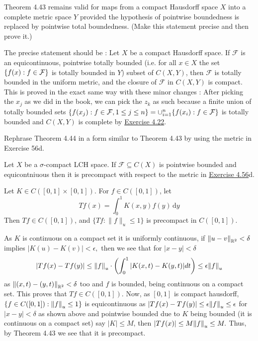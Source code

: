 \documentclass[12pt,a4paper]{article}
\begin{document}
\begin{problem}\label{prob:4-61}
Theorem 4.43 remains valid for maps from a compact Hausdorff space $X$ into a complete metric space $Y$ provided the hypothesis of pointwise boundedness is replaced by pointwise total boundedness. (Make this statement precise and then prove it.)
\end{problem}
\begin{solution}
The precise statement should be : Let $X$ be a compact Hausdorff space. 
If $\mathcal F$ is an equicontinuous, pointwise totally bounded (i.e. for all $x\in X$ the set $ \qty{f(x):f\in\mathcal F}$ is totally bounded in $Y$) subset of $C(X,Y)$, then $\mathcal F$ is totally bounded in the uniform metric, and the closure of $\mathcal F$ in $C(X,Y)$ is compact. \\
This is proved in the exact same way with these minor changes : After picking the $x_j$ as we did in the book, we can pick the $z_k$ as such because a finite union of totally bounded sets $ \qty{f(x_j):f\in\mathcal F,1\leq j\leq n}=\cup_{i=1}^n \qty{f(x_i):f\in\mathcal F}$ is totally bounded and $C(X,Y)$ is complete by \hyperref[prob:4-22]{Exercise 4.22}.  
\end{solution}
\begin{problem}\label{prob:4-62}
Rephrase Theorem 4.44 in a form similar to Theorem 4.43 by using the metric in Exercise 56d.
\end{problem}
\begin{solution}
Let $X$ be a $\sigma$-compact LCH space. 
If $\mathcal F \subseteq C(X)$ is pointwise bounded and equicontniuous then it is precompact with respect to the metric in \hyperref[prob:4-56]{Exercise 4.56}d. 
\end{solution}
\begin{problem}\label{prob:4-63}
Let $K \in C([0,1] \times [0,1])$. For $f \in C([0,1])$, let 
\[
    Tf(x) = \int_0^1 K(x,y)f(y)\,\mathrm{d}y
\] 
Then $Tf \in C([0,1])$, and $\{Tf : \|f\|_u \le 1\}$ is precompact in $C([0,1])$.
\end{problem}
\begin{solution}
    As $K$ is continuous on a compact set it is uniformly continuous, if  $\norm{u-v}_{\mathbb{R}^2}<\delta$ implies $|K(u)-K(v)|<\epsilon,$ then we see that for $|x-y|<\delta$ 
\[
    |Tf(x)-Tf(y)|\leq\norm{f}_u\cdot\qty(\int_0^1|K(x,t)-K(y,t)|dt)\leq\epsilon\norm{f}_u
\]
as $\norm{(x,t)-(y,t)}_{\mathbb{R}^2}<\delta$ too and $f$ is bounded, being continuous on a compact set.  
This proves that $Tf\in C([0,1]).$ 
Now, as $[0,1]$ is compact hausdorff, $ \qty{f\in C([0,1]):\norm{f}_u\leq 1}$ is equicontinuous as $|Tf(x)-Tf(y)|\leq\epsilon\norm{f}_u\leq\epsilon$ for $|x-y|<\delta$ as shown above and pointwise bounded due to $K$ being bounded (it is continuous on a compact set) say $|K|\leq M$, then $|Tf(x)|\leq M\norm{f}_u\leq M.$ 
Thus, by Theorem 4.43 we see that it is precompact. 
\end{solution}
\end{document}
